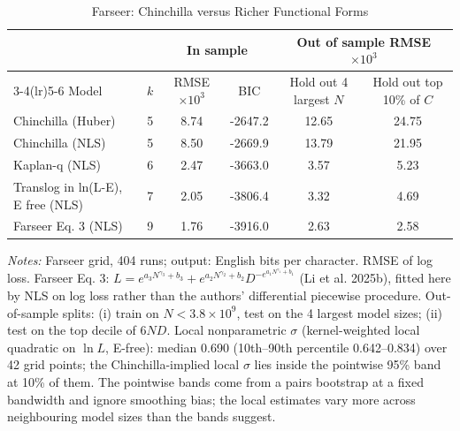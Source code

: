 \begin{table}[!htbp]
\centering
\footnotesize
\caption{Farseer: Chinchilla versus Richer Functional Forms}
\label{tab:farseer}
\begin{threeparttable}
\begin{tabular}{lccccc}
\toprule
& & \multicolumn{2}{c}{In sample} & \multicolumn{2}{c}{Out of sample RMSE $\times 10^3$} \\
\cmidrule(lr){3-4}\cmidrule(lr){5-6}
Model & $k$ & RMSE $\times 10^3$ & BIC & Hold out 4 largest $N$ & Hold out top 10\% of $C$ \\
\midrule
Chinchilla (Huber) & 5 & 8.74 & -2647.2 & 12.65 & 24.75 \\
Chinchilla (NLS) & 5 & 8.50 & -2669.9 & 13.79 & 21.95 \\
Kaplan-q (NLS) & 6 & 2.47 & -3663.0 & 3.57 & 5.23 \\
Translog in ln(L-E), E free (NLS) & 7 & 2.05 & -3806.4 & 3.32 & 4.69 \\
Farseer Eq. 3 (NLS) & 9 & 1.76 & -3916.0 & 2.63 & 2.58 \\
\bottomrule
\end{tabular}
\begin{tablenotes}[flushleft]
\footnotesize
\item \textit{Notes:} Farseer grid, 404 runs; output: English bits per character. RMSE of log loss. Farseer Eq. 3: $L=e^{a_3N^{\gamma_3}+b_3}+e^{a_2N^{\gamma_2}+b_2}D^{-e^{a_1N^{\gamma_1}+b_1}}$ (Li et al. 2025b), fitted here by NLS on log loss rather than the authors' differential piecewise procedure. Out-of-sample splits: (i) train on $N<3.8\times10^9$, test on the 4 largest model sizes; (ii) test on the top decile of $6ND$. Local nonparametric $\sigma$ (kernel-weighted local quadratic on $\ln L$, E-free): median 0.690 (10th--90th percentile 0.642--0.834) over 42 grid points; the Chinchilla-implied local $\sigma$ lies inside the pointwise 95\% band at 10\% of them. The pointwise bands come from a pairs bootstrap at a fixed bandwidth and ignore smoothing bias; the local estimates vary more across neighbouring model sizes than the bands suggest.
\end{tablenotes}
\end{threeparttable}
\end{table}
